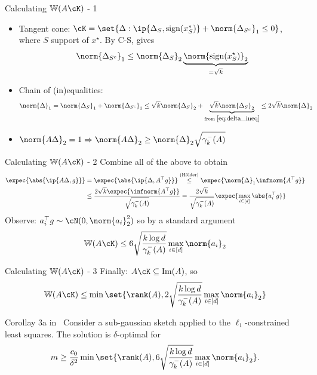 \documentclass[10pt]{beamer}
\newcommand{\xstar}{x^{\star}}
\begin{document}
\begin{frame}{Calculating $\mathbb{W}(A \cK)$ - 1}
    \begin{itemize}
        \item
        Tangent cone: $\cK = \set{\Delta : \ip{\Delta_S,
        \mathrm{sign}(x^*_S)} + \norm{\Delta_{S^c}}_1 \leq 0}$,
        where $S$ support of $\xstar$. By C-S, gives
        \begin{equation}
            \norm{\Delta_{S^c}}_1 \leq \norm{\Delta_S}_2
            \underbrace{\norm{\mathrm{sign}(\xstar_S)}_2}_{= \sqrt{k}}
            \label{eq:delta_ineq}
        \end{equation}

        \item Chain of (in)equalities:
        \begin{align*}
            \norm{\Delta}_1 &= \norm{\Delta_S}_1 + \norm{\Delta_{S^c}}_1
            \leq \sqrt{k} \norm{\Delta_S}_2 +
            \underbrace{\sqrt{k} \norm{\Delta_{S}}_2}_{
                \text{from } \eqref{eq:delta_ineq}}
            \leq 2 \sqrt{k} \norm{\Delta}_2
        \end{align*}
        \item $\norm{A \Delta}_2 = 1 \Rightarrow
        \norm{A \Delta}_2 \geq \norm{\Delta}_2 \sqrt{\gamma_{k}^- (A)}$
    \end{itemize}
\end{frame}
\begin{frame}{Calculating $\mathbb{W}(A \cK)$ - 2}
    Combine all of the above to obtain
    \begin{align*}
        \expec{\abs{\ip{A \Delta, g}}} &= \expec{\abs{\ip{\Delta, A^\top g}}}
        \overset{(\text{H{\"o}lder})}{\leq}
        \expec{\norm{\Delta}_1
        \infnorm{A^\top g}} \\
        & \leq \frac{2 \sqrt{k} \expec{\infnorm{A^\top g}}}{
        \sqrt{\gamma_k^-(A)}} =
        \frac{2 \sqrt{k}}{\sqrt{\gamma_k^-(A)}}
        \expec{\max_{i \in [d]} \abs{a_i^\top g}}
    \end{align*}
    Observe: $a_i^\top g \sim \cN(0, \norm{a_i}_2^2)$ so by a standard
    argument~\cite[Eq. (3.13)]{LedTal13}
    \[
        \mathbb{W}(A \cK) \leq 6 \sqrt{\frac{k \log d}{\gamma_k^-(A)}}
        \max_{i \in [d]} \norm{a_i}_2
    \]
\end{frame}

\begin{frame}{Calculating $\mathbb{W}(A \cK)$ - 3}
    Finally: $A \cK \subseteq \mathrm{Im}(A)$, so
    \[
        \mathbb{W}(A\cK) \leq \min\set{\rank(A),
        2 \sqrt{\frac{k \log d}{\gamma_k^-(A)}} \max_{i \in [d]} \norm{a_i}_2}
    \]
    \begin{block}{Corollay 3a in~\cite{PilWain15}}
        Consider a sub-gaussian sketch applied to the $\ell_1$-constrained
        least squares. The solution is $\delta$-optimal for
        \[
            m \geq \frac{c_0}{\delta^2} \min\set{\rank(A),
            6 \sqrt{\frac{k \log d}{\gamma_k^-(A)}} \max_{i \in [d]}
            \norm{a_i}_2}.
        \]
    \end{block}
\end{frame}
\end{document}
